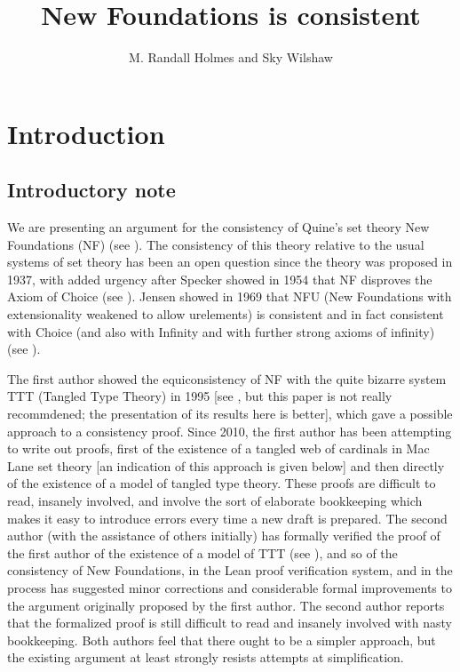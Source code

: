 \documentclass[112pt]{article}
\title{New Foundations is consistent}
\author{M. Randall Holmes and Sky Wilshaw}
\begin{document}
\maketitle

\tableofcontents

\newpage


\newpage

\section{Introduction}

\subsection{Introductory note}

We are presenting an argument for the consistency of Quine's set theory New Foundations (NF) (see \cite{nf}).  The consistency of this theory relative to the usual systems of set theory has been an open question since the theory was proposed in 1937, with added urgency after Specker showed in 1954 that NF disproves the Axiom of Choice (see \cite{notac}).
Jensen showed in 1969 that NFU (New Foundations with extensionality weakened to allow urelements) is consistent and in fact consistent with Choice (and also with Infinity and with further strong axioms of infinity) (see \cite{nfu}).  

The first author showed the equiconsistency of NF with the quite bizarre system TTT (Tangled Type Theory) in 1995 [see \cite{tangled)}, but this paper is not really recommdened; the presentation of its results here is better], which gave a possible approach to a consistency proof.  Since 2010, the first author has been attempting to write out proofs, first of the existence of a tangled web of cardinals in Mac Lane set theory [an indication of this approach is given below] and then directly of the existence of a model of tangled type theory.  These proofs are difficult to read, insanely involved, and involve the sort of elaborate bookkeeping which makes it easy to introduce errors every time a new draft is prepared.  The second author (with the assistance of others initially)
has formally verified the proof of the first author of the existence of a model of TTT (see \cite{wilshaw}), and so of the consistency of New Foundations, in the Lean proof verification system, and in the process has suggested minor corrections and considerable formal improvements to the argument originally proposed by the first author.  The second author reports that the formalized proof is still difficult to read and insanely involved with nasty bookkeeping.  Both authors feel that there ought to be a simpler approach, but the existing argument at least strongly resists attempts at simplification.
\end{document}
